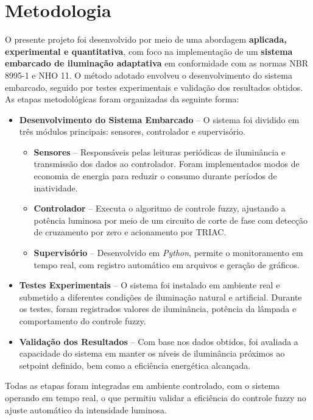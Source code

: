 % 
%
\chapter{Metodologia}

O presente projeto foi desenvolvido por meio de uma abordagem \textbf{aplicada, experimental e quantitativa}, com foco na implementação de um \textbf{sistema embarcado de iluminação adaptativa} em conformidade com as normas \gls{NBR} 8995-1 e \gls{NHO} 11. O método adotado envolveu o desenvolvimento do sistema embarcado, seguido por testes experimentais e validação dos resultados obtidos. As etapas metodológicas foram organizadas da seguinte forma:

\begin{itemize}
    \item \textbf{Desenvolvimento do Sistema Embarcado} – O sistema foi dividido em três módulos principais: sensores, controlador e supervisório.
    \begin{itemize}
        \item \textbf{Sensores} – Responsáveis pelas leituras periódicas de iluminância e transmissão dos dados ao controlador. Foram implementados modos de economia de energia para reduzir o consumo durante períodos de inatividade.

        \item \textbf{Controlador} – Executa o algoritmo de controle fuzzy, ajustando a potência luminosa por meio de um circuito de corte de fase com detecção de cruzamento por zero e acionamento por TRIAC.

        \item \textbf{Supervisório} – Desenvolvido em \textit{Python}, permite o monitoramento em tempo real, com registro automático em arquivos e geração de gráficos.
    \end{itemize}

    \item \textbf{Testes Experimentais} – O sistema foi instalado em ambiente real e submetido a diferentes condições de iluminação natural e artificial. Durante os testes, foram registrados valores de iluminância, potência da lâmpada e comportamento do controle fuzzy.

    \item \textbf{Validação dos Resultados} – Com base nos dados obtidos, foi avaliada a capacidade do sistema em manter os níveis de iluminância próximos ao setpoint definido, bem como a eficiência energética alcançada.
\end{itemize}

Todas as etapas foram integradas em ambiente controlado, com o sistema operando em tempo real, o que permitiu validar a eficiência do controle fuzzy no ajuste automático da intensidade luminosa.



